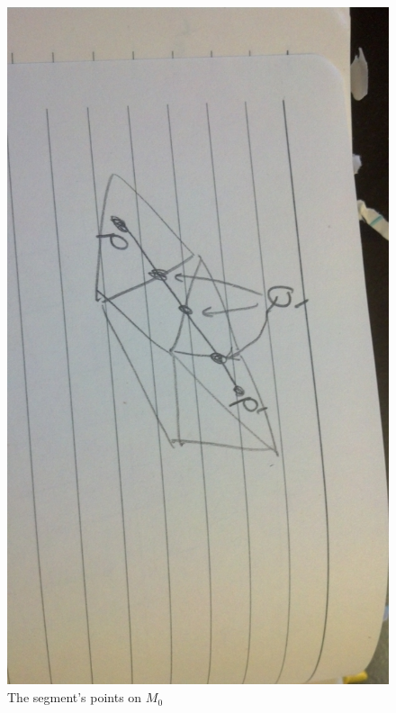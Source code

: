 \begin{figure}[ht]
\centering
\includegraphics[width=\columnwidth]{segmentonmesh.jpg}
\caption{The segment's points on $M_0$}
\label{segmentonmesh}
\end{figure}


